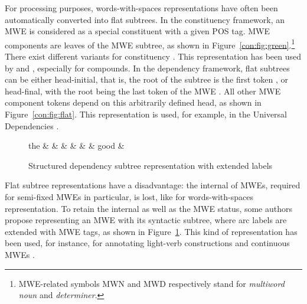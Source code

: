 \documentclass[output=paper]{langsci/langscibook}
\begin{document}
For processing purposes, words-with-spaces representations have often been automatically converted into flat subtrees. In the constituency framework, an MWE is considered as a special constituent with a given POS tag. MWE components are leaves of the MWE subtree, as shown in Figure~\ref{con:fig:green}.\footnote{MWE-related symbols MWN and MWD respectively stand for \textit{multiword noun} and \textit{determiner}.} There exist different variants for constituency  \citep{gowiska:2010}. This representation has been used by \citet{arun05} and \citet{green11}, especially for compounds. 
In the dependency framework, flat subtrees can be either head-initial, that is, the root of the subtree is the first token \citep{nivre04,seddah13}, or head-final, with the root being the last token of the MWE \citep{eryigit:2011:multiword}. All other MWE component tokens depend on this arbitrarily defined head, as shown in Figure~\ref{con:fig:flat}. This representation is used, for example, in the Universal Dependencies  \citep{nivre16}.

\begin{figure}[t]
\small
\begin{center}
\begin{dependency}[edge unit distance=2ex]
\begin{deptext}[column sep=.7cm]
the \& \color{red}{prime} \& \color{red}{minister} \& \color{blue}{made} \& \color{orange}{a} \& \color{orange}{few} \& good \& \color{blue}{decisions} \\
\end{deptext}
\end{dependency}
\vspace{-0.3cm}
\caption{Structured dependency subtree representation with extended labels}
\label{con:fig:extended-labels}
\end{center}
\end{figure}



Flat subtree representations have a disadvantage: the internal  of MWEs, required for semi-fixed MWEs in particular, is lost, like for words-with-spaces representation. To retain the internal  as well as the MWE status, some authors propose representing an MWE with its syntactic subtree, where arc labels are extended with MWE tags, as shown in Figure~\ref{con:fig:extended-labels}. This kind of representation has been used, for instance, for annotating light-verb constructions \citep{vincze13} and continuous MWEs \citep{candito2014strategies}. 
\end{document}
